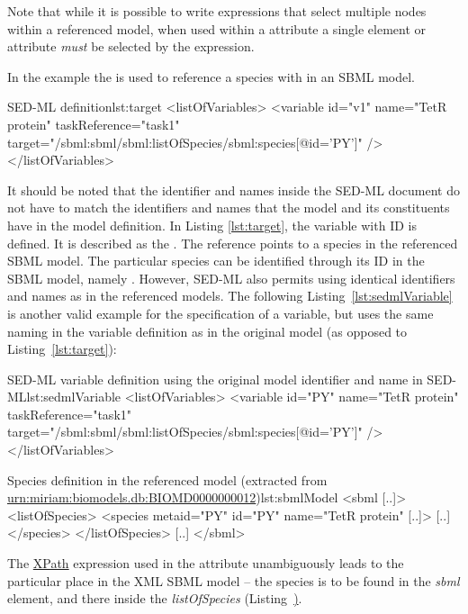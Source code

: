 Note that while it is possible to write  expressions that select multiple nodes within a referenced model, when used within a  attribute a single element or attribute \emph{must} be selected by the expression.

In the example the  is used to reference a species with  in an SBML model.
\begin{myXmlLst}{SED-ML  definition}{lst:target}
<listOfVariables>
	<variable id="v1" name="TetR protein" taskReference="task1" 
		target="/sbml:sbml/sbml:listOfSpecies/sbml:species[@id='PY']" />
</listOfVariables>
\end{myXmlLst}

It should be noted that the identifier and names inside the SED-ML document do not have to match the identifiers and names that the model and its constituents have in the model definition. In Listing \ref{lst:target}, the variable with ID  is defined. It is described as the . The reference points to a species in the referenced SBML model. The particular species can be identified through its ID in the SBML model, namely . However, SED-ML also permits using identical identifiers and names as in the referenced models. The following Listing~\vref{lst:sedmlVariable} is another valid example for the specification of a variable, but uses the same naming in the variable definition as in the original model (as opposed to Listing~\ref{lst:target}):

\begin{myXmlLst}{SED-ML variable definition using the original model identifier and name in SED-ML}{lst:sedmlVariable}
<listOfVariables>
	<variable id="PY" name="TetR protein"  taskReference="task1" 
		target="/sbml:sbml/sbml:listOfSpecies/sbml:species[@id='PY']" />
</listOfVariables>
\end{myXmlLst}

\begin{myXmlLst}{Species definition in the referenced model (extracted from \url{urn:miriam:biomodels.db:BIOMD0000000012})}{lst:sbmlModel}
<sbml [..]>
	<listOfSpecies>
		<species metaid="PY" id="PY" name="TetR protein" [..]>
		[..]
		</species>
 	</listOfSpecies>
 	[..]
</sbml>
\end{myXmlLst}

The \hyperref[sec:xpath]{XPath} expression used in the  attribute unambiguously leads to the particular place in the XML SBML model -- the species is to be found in the \emph{sbml} element, and there inside the \emph{listOfSpecies} (Listing~\href{lst:sbmlModel}). 

